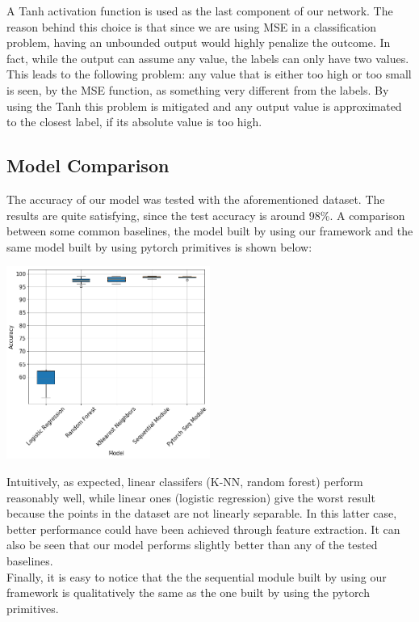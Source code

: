 \documentclass[10pt,conference,compsocconf]{IEEEtran}
\begin{document}
A Tanh activation function is used as the last component of our network. The reason behind this choice is that since we are using MSE in a classification problem, having an unbounded output would highly penalize the outcome. In fact, while the output can assume any value, the labels can only have two values. This leads to the following problem: any value that is either too high or too small is seen, by the MSE function, as something very different from the labels. 
By using the Tanh this problem is mitigated and any output value is approximated to the closest label, if its absolute value is too high.

\subsection{Model Comparison}
The accuracy of our model was tested with the aforementioned dataset. The results are quite satisfying, since the test accuracy is around 98\%.
A comparison between some common baselines, the model built by using our framework and the same model built by using pytorch primitives is shown below:
\begin{center}
	\captionsetup{type=figure}
	\includegraphics[width=0.5\textwidth]{img/boxplots_final.png}
	\label{fig:boxplot}
\end{center} 
Intuitively, as expected, linear classifers (K-NN, random forest) perform
reasonably well, while linear ones (logistic regression) give the worst result
because the points in the dataset are not linearly separable. In this latter case,
better performance could have been achieved through feature extraction.
It can also be seen that our model performs slightly better than any of the tested
baselines.\\
Finally, it is easy to notice that the the sequential module built by using our framework is qualitatively the same as the one built by using the pytorch primitives.
\end{document}
